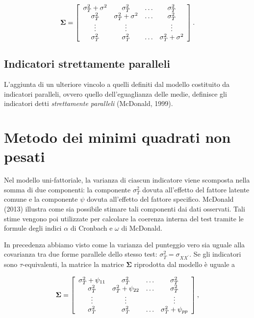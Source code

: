 \documentclass[
  11pt,
]{krantz}
\theoremstyle{definition}
\theoremstyle{definition}
\theoremstyle{definition}
\theoremstyle{definition}
\theoremstyle{remark}
\begin{document}
\[
\boldsymbol{\Sigma}=\left[
      \begin{array}{ c c c c }
        \sigma_{T}^2 + \sigma^2 & \sigma_{T}^2 & \dots & \sigma_{T}^2 \\
        \sigma_{T}^2 & \sigma_{T}^2 + \sigma^2 & \dots & \sigma_{T}^2 \\
        \vdots & \vdots & & \vdots\\
        \sigma_{T}^2 & \sigma_{T}^2 & \dots & \sigma_{T}^2 +\sigma^2 \notag
      \end{array} 
    \right].
\]

\hypertarget{indicatori-strettamente-paralleli}{%
\subsection{Indicatori strettamente paralleli}\label{indicatori-strettamente-paralleli}}

L'aggiunta di un ulteriore vincolo a quelli definiti dal modello costituito da indicatori paralleli, ovvero quello dell'eguaglianza delle medie, definisce gli indicatori detti \emph{strettamente paralleli} (McDonald, 1999).

\hypertarget{metodo-dei-minimi-quadrati-non-pesati}{%
\section{Metodo dei minimi quadrati non pesati}\label{metodo-dei-minimi-quadrati-non-pesati}}

Nel modello uni-fattoriale, la varianza di ciascun indicatore viene scomposta nella somma di due componenti: la componente \(\sigma^2_T\) dovuta all'effetto del fattore latente comune e la componente \(\psi\) dovuta all'effetto del fattore specifico. McDonald (2013) illustra come sia possibile stimare tali componenti dai dati osservati. Tali stime vengono poi utilizzate per calcolare la coerenza interna del test tramite le formule degli indici \(\alpha\) di Cronbach e \(\omega\) di McDonald.

In precedenza abbiamo visto come la varianza del punteggio vero sia uguale alla covarianza tra due forme parallele dello stesso test: \(\sigma^2_T = \sigma_{XX^\prime}\). Se gli indicatori sono \(\tau\)-equivalenti, la matrice la matrice \(\boldsymbol{\Sigma}\) riprodotta dal modello è uguale a

\[
\boldsymbol{\Sigma}=\left[
      \begin{array}{ c c c c }
        \sigma_{T}^2 + \psi_{11} & \sigma_{T}^2 & \dots & \sigma_{T}^2 \\
        \sigma_{T}^2 & \sigma_{T}^2 + \psi_{22} & \dots & \sigma_{T}^2 \\
        \vdots & \vdots & & \vdots\\
        \sigma_{T}^2 & \sigma_{T}^2 & \dots & \sigma_{T}^2 + \psi_{pp} \notag
      \end{array}
    \right],
\]
\end{document}
